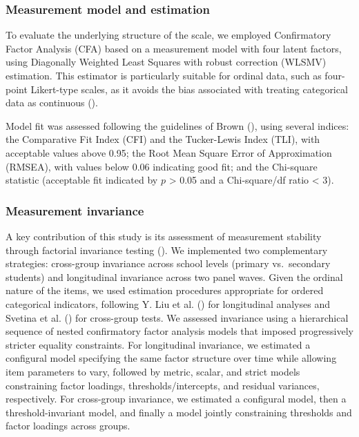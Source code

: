 \documentclass[
  13pt,
]{article}
\begin{document}
\subsubsection{Measurement model and
estimation}\label{measurement-model-and-estimation}

To evaluate the underlying structure of the scale, we employed
Confirmatory Factor Analysis (CFA) based on a measurement model with
four latent factors, using Diagonally Weighted Least Squares with robust
correction (WLSMV) estimation. This estimator is particularly suitable
for ordinal data, such as four-point Likert-type scales, as it avoids
the bias associated with treating categorical data as continuous
().

Model fit was assessed following the guidelines of Brown
(), using several indices:
the Comparative Fit Index (CFI) and the Tucker-Lewis Index (TLI), with
acceptable values above 0.95; the Root Mean Square Error of
Approximation (RMSEA), with values below 0.06 indicating good fit; and
the Chi-square statistic (acceptable fit indicated by \(p\)
\textgreater{} 0.05 and a Chi-square/df ratio \textless{} 3).

\subsubsection{Measurement invariance}\label{measurement-invariance}

A key contribution of this study is its assessment of measurement
stability through factorial invariance testing
().
We implemented two complementary strategies: cross-group invariance
across school levels (primary vs.~secondary students) and longitudinal
invariance across two panel waves. Given the ordinal nature of the
items, we used estimation procedures appropriate for ordered categorical
indicators, following Y. Liu et al.
() for longitudinal analyses and
Svetina et al. () for
cross-group tests. We assessed invariance using a hierarchical sequence
of nested confirmatory factor analysis models that imposed progressively
stricter equality constraints. For longitudinal invariance, we estimated
a configural model specifying the same factor structure over time while
allowing item parameters to vary, followed by metric, scalar, and strict
models constraining factor loadings, thresholds/intercepts, and residual
variances, respectively. For cross-group invariance, we estimated a
configural model, then a threshold-invariant model, and finally a model
jointly constraining thresholds and factor loadings across groups.
\end{document}
